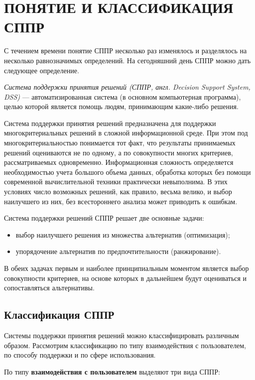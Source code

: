 \section[Понятие и классификация СППР]
{ПОНЯТИЕ И КЛАССИФИКАЦИЯ СППР}

С течением времени понятие СППР несколько раз изменялось и разделялось на
несколько равнозначимых определений. На сегодняшний день СППР можно дать
следующее определение.

\textit{Система поддержки принятия решений (СППР, англ. Decision Support System, DSS)} ---
автоматизированная система (в основном компьютерная программа), целью которой
является помощь людям, принимающим какие-либо решения.

Система поддержки принятия решений предназначена для поддержки многокритериальных
решений в сложной информационной среде. При этом под многокритериальностью понимается
тот факт, что результаты принимаемых решений оцениваются не по одному, а по совокупности
многих критериев, рассматриваемых одновременно. Информационная сложность определяется
необходимостью учета большого объема данных, обработка которых без помощи
современной вычислительной техники практически невыполнима. В этих условиях число
возможных решений, как правило, весьма велико, и выбор наилучшего из них,
без всестороннего анализа может приводить к ошибкам.

Система поддержки решений СППР решает две основные задачи:
\begin{itemize}
  \item выбор наилучшего решения из множества альтернатив (оптимизация);
  \item упорядочение альтернатив по предпочтительности (ранжирование).
\end{itemize}

В обеих задачах первым и наиболее принципиальным моментом является выбор
совокупности критериев, на основе которых в дальнейшем будут оцениваться
и сопоставляться альтернативы.


\subsection{Классификация СППР}

Системы поддержки принятия решений можно классифицировать различным образом.
Рассмотрим классификацию по типу взаимодействия с пользователем, по способу
поддержки и по сфере использования.

По типу \textbf{взаимодействия с пользователем} выделяют три вида СППР:

